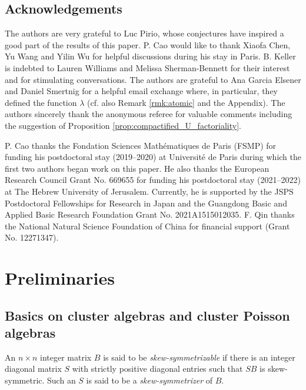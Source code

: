 \documentclass{amsart}
\theoremstyle{definition}
\theoremstyle{remark}
\numberwithin{equation}{section}
\begin{document}
\subsection*{Acknowledgements}

The authors are very grateful to Luc Pirio, whose conjectures have inspired a good part of the results of this paper. P. Cao would like to thank Xiaofa Chen, Yu Wang and Yilin Wu for helpful discussions during his stay in Paris. B. Keller is indebted
to Lauren Williams and Melissa Sherman-Bennett for their interest and for stimulating conversations. The authors are grateful to Ana Garcia Elsener and Daniel Smertnig for a helpful email exchange \cite{GS_2022} where, in particular, they defined the function $\lambda$ (cf. also Remark \ref{rmk:atomic} and the Appendix). The authors sincerely thank the anonymous referee for valuable comments including the suggestion of Proposition \ref{prop:compactified_U_factoriality}.
 

P. Cao thanks the Fondation Sciences Math\'ematiques de Paris (FSMP) for funding his postdoctoral
stay (2019--2020) at Universit\'e de Paris during which the first two authors began work on this paper. He also thanks the European Research Council Grant No. 669655 for funding his postdoctoral stay (2021--2022) at The Hebrew University of Jerusalem. Currently, he is supported by the JSPS Postdoctoral Fellowships for Research in Japan and  the Guangdong Basic and Applied Basic Research
Foundation Grant No. 2021A1515012035. F. Qin thanks the National Natural Science Foundation of China for financial support (Grant No. 12271347).




\section{Preliminaries}\label{sec2}

\subsection{Basics on cluster algebras and cluster Poisson algebras}

An $n\times n$ integer matrix $B$ is said to be {\em  skew-symmetrizable} if there is an integer diagonal matrix $S$ with strictly positive diagonal entries such that $SB$ is skew-symmetric. Such an $S$ is said to be a {\em  skew-symmetrizer} of $B$.
\end{document}
